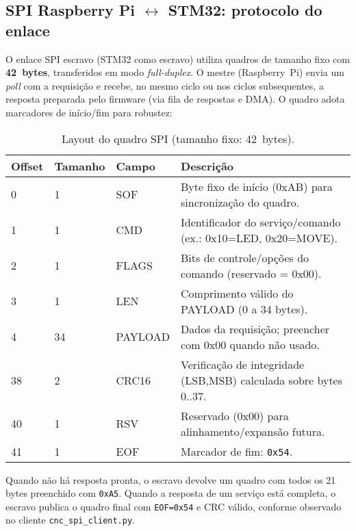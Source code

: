 \subsection*{SPI Raspberry Pi \texorpdfstring{$\leftrightarrow$}{<->} STM32: protocolo do enlace}

O enlace SPI escravo (STM32 como escravo) utiliza quadros de tamanho fixo com \textbf{42~bytes},
transferidos em modo \emph{full-duplex}. O mestre (Raspberry~Pi) envia um
\emph{poll} com a requisição e recebe, no mesmo ciclo ou nos ciclos subsequentes,
a resposta preparada pelo firmware (via fila de respostas e DMA). O quadro adota
marcadores de início/fim para robustez:

\begin{table}[h]
  \centering
  \caption{Layout do quadro SPI (tamanho fixo: 42~bytes).}
  \label{tab:spi-frame}
  \setlength{\tabcolsep}{4pt}\footnotesize
  \begin{tabularx}{\textwidth}{lllX}
    \toprule
    Offset & Tamanho & Campo & Descrição \\
    \midrule
    0 & 1 & SOF & Byte fixo de in\'icio (0xAB) para sincroniza\c{c}\~ao do quadro.\\
    1 & 1 & CMD & Identificador do servi\c{c}o/comando (ex.: 0x10=LED, 0x20=MOVE). \\
    2 & 1 & FLAGS & Bits de controle/op\c{c}\~oes do comando (reservado = 0x00). \\
    3 & 1 & LEN & Comprimento v\'alido do PAYLOAD (0 a 34 bytes). \\
    4 & 34 & PAYLOAD & Dados da requisi\c{c}\~ao; preencher com 0x00 quando n\~ao usado. \\
    38 & 2 & CRC16 & Verifica\c{c}\~ao de integridade (LSB,MSB) calculada sobre bytes 0..37. \\
    40 & 1 & RSV & Reservado (0x00) para alinhamento/expans\~ao futura. \\
    41 & 1 & EOF & Marcador de fim: \texttt{0x54}. \\
    \bottomrule
  \end{tabularx}
\end{table}

Quando não há resposta pronta, o escravo devolve um quadro com todos os 21 bytes preenchido com \texttt{0xA5}.
Quando a resposta de um serviço está completa, o escravo publica o quadro final
com \texttt{EOF=0x54} e CRC válido, conforme observado no cliente \texttt{cnc\_spi\_client.py}.

